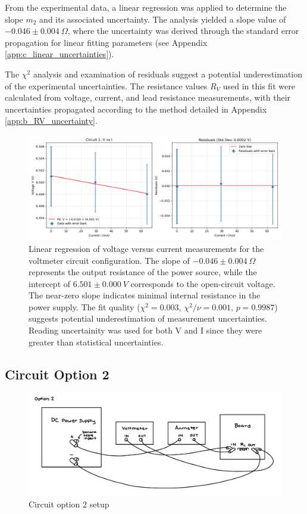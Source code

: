 \documentclass{article} %
\begin{document}
From the experimental data, a linear regression was applied to determine the slope $m_2$ and its associated uncertainty. 
The analysis yielded a slope value of $-0.046 \pm 0.004~\Omega$, where the uncertainty was derived through the standard error propagation for linear fitting parameters (see Appendix \ref{app:c_linear_uncertainties}).

The $\chi^2$ analysis and examination of residuals suggest a potential underestimation of the experimental uncertainties. 
The resistance values $R_V$ used in this fit were calculated from voltage, current, and lead resistance measurements, with their uncertainties propagated according to the method detailed in Appendix \ref{app:b_RV_uncertainty}.
\begin{figure}[htbp]            %
  \centering
  \includegraphics[width=1\linewidth]{Figs/Circuit_1.png}
\caption{Linear regression of voltage versus current measurements for the voltmeter circuit configuration. 
                The slope of $-0.046 \pm 0.004~\Omega$ represents the output resistance of the power source, while the intercept of $6.501 \pm 0.000~V$ corresponds to the open-circuit voltage. 
                The near-zero slope indicates minimal internal resistance in the power supply. 
                The fit quality ($\chi^2 = 0.003$, $\chi^2/\nu = 0.001$, $p = 0.9987$) suggests potential underestimation of measurement uncertainties.
                Reading uncertainity was used for both V and I since they were greater than statistical uncertainties.}    
                \label{fig:circuit_1_fit}
\end{figure}

\newpage

\subsection{Circuit Option 2}

\begin{figure}[htbp]            %
  \centering
  \includegraphics[width=0.9\linewidth]{Figs/Cct_2_Diagram.png}
  \caption{Circuit option 2 setup}
  \label{fig:Cct_2_Diagram}
\end{figure}
\end{document}
